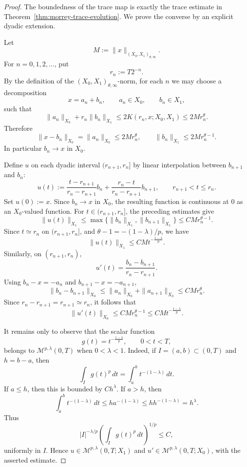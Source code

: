 \documentclass[10pt,a4paper]{amsart}
\begin{document}
	\begin{proof}
	The boundedness of the trace map is exactly the trace estimate in Theorem~\ref{thm:morrey-trace-evolution}.  We prove the converse by an explicit dyadic extension.

	Let
	\[
	M:=\|x\|_{(X_0,X_1)_{\theta,\infty}}.
	\]
	For \(n=0,1,2,\ldots\), put
	\[
	r_n:=T2^{-n}.
	\]
	By the definition of the \((X_0,X_1)_{\theta,\infty}\)-norm, for each \(n\) we may choose a decomposition
	\[
	x=a_n+b_n,
	\qquad a_n\in X_0,
	\qquad b_n\in X_1,
	\]
	such that
	\[
	\|a_n\|_{X_0}+r_n\|b_n\|_{X_1}
	\le
	2K(r_n,x;X_0,X_1)
	\le
	2Mr_n^\theta.
	\]
	Therefore
	\[
	\|x-b_n\|_{X_0}=\|a_n\|_{X_0}\le 2Mr_n^\theta,
	\qquad
	\|b_n\|_{X_1}\le 2Mr_n^{\theta-1}.
	\]
	In particular \(b_n\to x\) in \(X_0\).

	Define \(u\) on each dyadic interval \((r_{n+1},r_n]\) by linear interpolation between \(b_{n+1}\) and \(b_n\):
	\[
	u(t):=
	\frac{t-r_{n+1}}{r_n-r_{n+1}}b_n
	+
	\frac{r_n-t}{r_n-r_{n+1}}b_{n+1},
	\qquad r_{n+1}<t\le r_n.
	\]
	Set \(u(0):=x\).  Since \(b_n\to x\) in \(X_0\), the resulting function is continuous at \(0\) as an \(X_0\)-valued function.  For \(t\in(r_{n+1},r_n]\), the preceding estimates give
	\[
	\|u(t)\|_{X_1}
	\le
	\max\{\|b_n\|_{X_1},\|b_{n+1}\|_{X_1}\}
	\le
	C M r_n^{\theta-1}.
	\]
	Since \(t\simeq r_n\) on \((r_{n+1},r_n]\), and \(\theta-1=-(1-\lambda)/p\), we have
	\[
	\|u(t)\|_{X_1}
	\le
	C M t^{-\frac{1-\lambda}{p}}.
	\]
	Similarly, on \((r_{n+1},r_n)\),
	\[
	u'(t)=\frac{b_n-b_{n+1}}{r_n-r_{n+1}}.
	\]
	Using \(b_n-x=-a_n\) and \(b_{n+1}-x=-a_{n+1}\),
	\[
	\|b_n-b_{n+1}\|_{X_0}
	\le
	\|a_n\|_{X_0}+\|a_{n+1}\|_{X_0}
	\le
	C M r_n^\theta.
	\]
	Since \(r_n-r_{n+1}=r_{n+1}\simeq r_n\), it follows that
	\[
	\|u'(t)\|_{X_0}
	\le
	C M r_n^{\theta-1}
	\le
	C M t^{-\frac{1-\lambda}{p}}.
	\]

	It remains only to observe that the scalar function
	\[
	g(t)=t^{-\frac{1-\lambda}{p}},\qquad 0<t<T,
	\]
	belongs to \(\mathcal M^{p,\lambda}(0,T)\) when \(0<\lambda<1\).  Indeed, if \(I=(a,b)\subset(0,T)\) and \(h=b-a\), then
	\[
	\int_I g(t)^p\,dt=\int_a^b t^{-(1-\lambda)}\,dt.
	\]
	If \(a\le h\), then this is bounded by \(C h^\lambda\).  If \(a>h\), then
	\[
	\int_a^b t^{-(1-\lambda)}\,dt
	\le
	h a^{-(1-\lambda)}
	\le
	h h^{-(1-\lambda)}=h^\lambda.
	\]
	Thus
	\[
	|I|^{-\lambda/p}
	\left(\int_I g(t)^p\,dt\right)^{1/p}
	\le C,
	\]
	uniformly in \(I\).  Hence \(u\in\mathcal M^{p,\lambda}(0,T;X_1)\) and \(u'\in\mathcal M^{p,\lambda}(0,T;X_0)\), with the asserted estimate.
	\end{proof}
\end{document}
